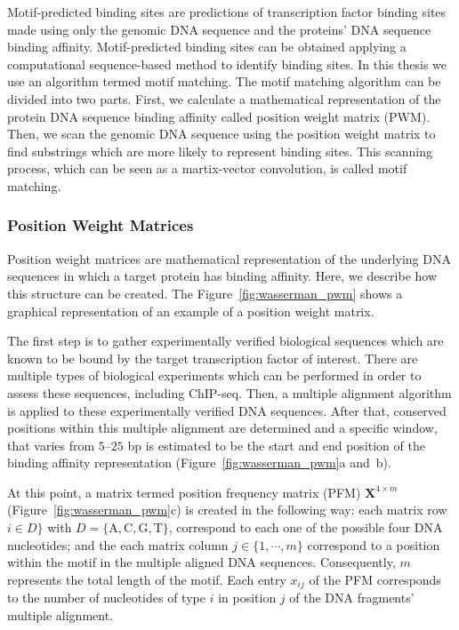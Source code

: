 Motif-predicted binding sites are predictions of transcription factor binding sites made using only the genomic DNA sequence and the proteins' DNA sequence binding affinity. Motif-predicted binding sites can be obtained applying a computational sequence-based method to identify binding sites. In this thesis we use an algorithm termed motif matching. The motif matching algorithm can be divided into two parts. First, we calculate a mathematical representation of the protein DNA sequence binding affinity called position weight matrix (PWM). Then, we scan the genomic DNA sequence using the position weight matrix to find substrings which are more likely to represent binding sites. This scanning process, which can be seen as a martix-vector convolution, is called motif matching.

\subsubsection{Position Weight Matrices}

Position weight matrices are mathematical representation of the underlying DNA sequences in which a target protein has binding affinity. Here, we describe how this structure can be created. The Figure~\ref{fig:wasserman_pwm} shows a graphical representation of an example of a position weight matrix.

The first step is to gather experimentally verified biological sequences which are known to be bound by the target transcription factor of interest. There are multiple types of biological experiments which can be performed in order to assess these sequences, including ChIP-seq. Then, a multiple alignment algorithm is applied to these experimentally verified DNA sequences. After that, conserved positions within this multiple alignment are determined and a specific window, that varies from $5$--$25$ bp is estimated to be the start and end position of the binding affinity representation (Figure~\ref{fig:wasserman_pwm}a and~b).

At this point, a matrix termed position frequency matrix (PFM) $\mathbf{X}^{4 \times m}$ (Figure~\ref{fig:wasserman_pwm}c) is created in the following way: each matrix row $i \in D\}$ with $D = \{\text{A},\text{C},\text{G},\text{T}\}$, correspond to each one of the possible four DNA nucleotides; and the each matrix column $ j \in \{1, \cdots, m\} $ correspond to a position within the motif in the multiple aligned DNA sequences. Consequently, $m$ represents the total length of the motif. Each entry $x_{ij}$ of the PFM corresponds to the number of nucleotides of type $ i $ in position $ j $ of the DNA fragments' multiple alignment.

